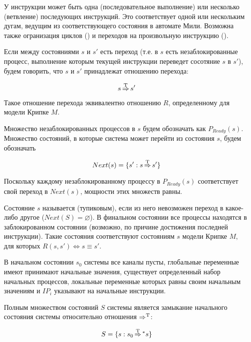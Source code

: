 У инструкции может быть одна (последовательное выполнение) или несколько (ветвление)
последующих инструкций. Это соответствует одной или нескольким дугам, ведущим из
соответствующего состояния в автомате Мили. Возможна также огранизация циклов ()
и переходов на произвольную инструкцию ().

Если между состояниями $s$ и $s'$ есть переход (т.е. в $s$ есть незаблокированные процесс,
выполнение которым текущей инструкции переведет сосотяние $s$ в $s'$), будем говорить, что
$s$ и $s'$ принадлежат отношению перехода:

\begin{equation}
  \label{eq:statetrans-def}
  s \operatorname{\operatorname*{\Rightarrow}^T} s'
\end{equation}

Такое отношение перехода эквивалентно отношению $R$, определенному для модели Крипке $M$.

Множество незаблокированных процессов в $s$ будем обозначать как $P_{Ready}(s)$.
Множество состояний, в которые система может перейти из состояния $s$, будем обозначать

\begin{equation}
  \label{eq:next-def}
  Next(s) = \{ s': s \operatorname{\operatorname*{\Rightarrow}^T} s' \}
\end{equation}

Поскольку каждому незаблокированному процессу в $P_{Ready}(s)$ соответствует свой переход
в $Next(s)$, мощности этих множеств равны.

Состояние $s$ называется  (тупиковым), если из него невозможен переход в
какое-либо другое ($Next(S) = \varnothing$). В финальном состоянии все процессы находятся в
заблокированном состоянии (возможно, по причине достижения последней инструкции). Такие
состояния соответствуют состояниям $s$ модели Крипке $M$, для которых $R(s, s')
\Leftrightarrow s \equiv s'$.

В начальном состоянии $s_0$ системы все каналы пусты, глобальные переменные имеют
принимают начальные значения, существует определенный набор начальных процессов, локальные
переменные которых равны своим начальным значениям и $IP_i$ указывают на начальные
инструкции.

Полным множеством состояний $S$ системы является замыкание начального
состояния системы относительно отношения $\operatorname{\operatorname*{\Rightarrow}^T}$:

\begin{equation}
  \label{eq:statespace-def}
  S = \{s: s_0 \operatorname{\operatorname*{\Rightarrow}^T} \mbox{}^* s\}
\end{equation}

